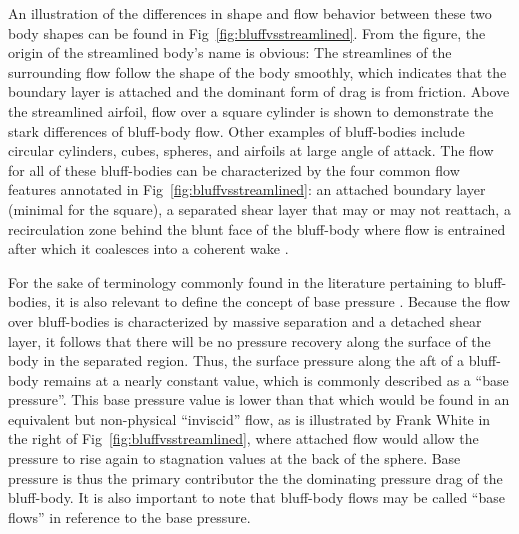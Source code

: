 \documentclass[journal]{new-aiaa}
\begin{document}
An illustration of the differences in shape and flow behavior between these two body shapes can be found in Fig~\ref{fig:bluffvsstreamlined}. From the figure, the origin of the streamlined body's name is obvious: The streamlines of the surrounding flow follow the shape of the body smoothly, which indicates that the boundary layer is attached and the dominant form of drag is from friction.  Above the streamlined airfoil, flow over a square cylinder is shown to demonstrate the stark differences of bluff-body flow. Other examples of bluff-bodies include circular cylinders, cubes, spheres, and airfoils at large angle of attack. The flow for all of these bluff-bodies can be characterized by the four common flow features annotated in Fig~\ref{fig:bluffvsstreamlined}: an attached boundary layer (minimal for the square), a separated shear layer that may or may not reattach, a recirculation zone behind the blunt face of the bluff-body where flow is entrained after which it coalesces into a coherent wake \cite{elkhoury2016assessment}.

For the sake of terminology commonly found in the literature pertaining to bluff-bodies, it is also relevant to define the concept of base pressure \cite{tanner1998theories}. Because the flow over bluff-bodies is characterized by massive separation and a detached shear layer, it follows that there will be no pressure recovery along the surface of the body in the separated region. Thus, the surface pressure along the aft of a bluff-body remains at a nearly constant value, which is commonly described as a ``base pressure''.  This base pressure value is lower than that which would be found in an equivalent but non-physical ``inviscid'' flow, as is illustrated by Frank White in the right of Fig~\ref{fig:bluffvsstreamlined}, where attached flow would allow the pressure to rise again to stagnation values at the back of the sphere.  Base pressure is thus the primary contributor the the dominating pressure drag of the bluff-body. It is also important to note that bluff-body flows may be called ``base flows'' in reference to the base pressure.
\end{document}
